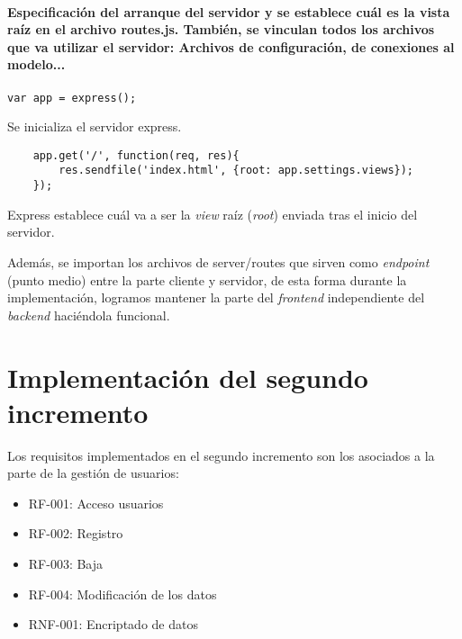 \paragraph*{Especificación del arranque del servidor y se establece cuál es la vista raíz en el archivo routes.js. También, se vinculan todos los archivos que va utilizar el servidor: Archivos de configuración, de conexiones al modelo...}


\medskip
\begin{lstlisting}
var app = express();
\end{lstlisting}


Se inicializa el servidor express.


\medskip
\begin{lstlisting}
	app.get('/', function(req, res){
		res.sendfile('index.html', {root: app.settings.views});
	});
\end{lstlisting}


Express establece cuál va a ser la \textit{view} raíz (\textit{root}) enviada tras el inicio del servidor.


Además, se importan los archivos de server/routes que sirven como \textit{endpoint} (punto medio) entre la parte cliente y servidor, de esta forma durante la implementación, logramos mantener la parte del \textit{frontend} independiente del \textit{backend} haciéndola funcional.


\section{Implementación del segundo incremento}
Los requisitos implementados en el segundo incremento son los asociados a la parte de la gestión de usuarios:


\begin{itemize}
\item RF-001: Acceso usuarios
\item RF-002: Registro
\item RF-003: Baja
\item RF-004: Modificación de los datos
\item RNF-001: Encriptado de datos
\end{itemize}


